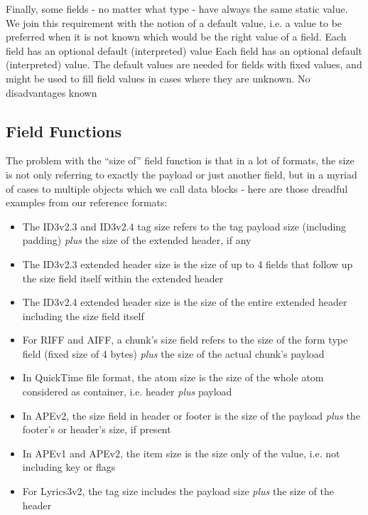 Finally, some fields - no matter what type - have always the same static value. We join this requirement with the notion of a default value, i.e. a value to be preferred when it is not known which would be the right value of a field.
{%
Each field has an optional default (interpreted) value
}
{%
Each field has an optional default (interpreted) value.
}
{%
The default values are needed for fields with fixed values, and might be used to fill field values in cases where they are unknown.
}
{%
No disadvantages known
}


\subsection{Field Functions}%
\label{sec:FieldFunctions}%


The problem with the ``size of'' field function is that in a lot of formats, the size is not only referring to exactly the payload or just another field, but in a myriad of cases to multiple objects which we call data blocks - here are those dreadful examples from our reference formats:
\begin{itemize}
\item The ID3v2.3 and ID3v2.4 tag size refers to the tag payload size (including padding) \emph{plus} the size of the extended header, if any 
\item The ID3v2.3 extended header size is the size of up to 4 fields that follow up the size field itself within the extended header
\item The ID3v2.4 extended header size is the size of the entire extended header including the size field itself
\item For RIFF and AIFF, a chunk's size field refers to the size of the form type field (fixed size of 4 bytes) \emph{plus} the size of the actual chunk's payload
\item In QuickTime file format, the atom size is the size of the whole atom considered as container, i.e. header \emph{plus} payload
\item In APEv2, the size field in header or footer is the size of the payload \emph{plus} the footer's or header's size, if present
\item In APEv1 and APEv2, the item size is the size only of the value, i.e. not including key or flags
\item For Lyrics3v2, the tag size includes the payload size \emph{plus} the size of the header 
\end{itemize}


